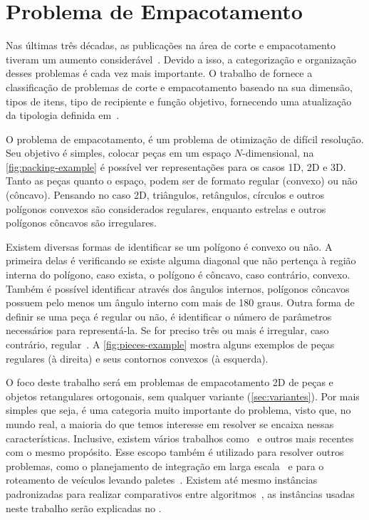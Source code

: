 \chapter{Problema de Empacotamento}\label{ch:problema-de-empacotamento}

Nas últimas três décadas, as publicações na área de corte e empacotamento tiveram um aumento
considerável~\cite{exact-solution-techniques,wascher2007improved}.
Devido a isso, a categorização e organização desses problemas é cada vez mais importante.
O trabalho de \citeauthor*{wascher2007improved} fornece a classificação de problemas de corte e
empacotamento baseado na sua dimensão, tipos de itens, tipo de recipiente e função objetivo,
fornecendo uma atualização da tipologia definida em~\cite{dyckhoff1990typology}.

O problema de empacotamento, é um problema de otimização de difícil resolução.
Seu objetivo é simples, colocar peças em um espaço $N$-dimensional, na \autoref{fig:packing-example}
é possível ver representações para os casos 1D, 2D e 3D\@.
Tanto as peças quanto o espaço, podem ser de formato regular (convexo) ou não (côncavo).
Pensando no caso 2D, triângulos, retângulos, círculos e outros polígonos convexos são
considerados regulares, enquanto estrelas e outros polígonos côncavos são irregulares.



Existem diversas formas de identificar se um polígono é convexo ou não.
A primeira delas é verificando se existe alguma diagonal que não pertença à região interna do
polígono, caso exista, o polígono é côncavo, caso contrário, convexo.
Também é possível identificar através dos ângulos internos, polígonos côncavos possuem pelo menos
um ângulo interno com mais de 180 graus.
Outra forma de definir se uma peça é regular ou não, é identificar o número de parâmetros
necessários para representá-la.
Se for preciso três ou mais é irregular, caso contrário, regular~\cite{aprendizado-reforco}.
A \autoref{fig:pieces-example} mostra alguns exemplos de peças regulares (à direita) e seus
contornos convexos (à esquerda).



O foco deste trabalho será em problemas de empacotamento 2D de peças e objetos retangulares
ortogonais, sem qualquer variante (\autoref{sec:variantes}).
Por mais simples que seja, é uma categoria muito importante do problema, visto que, no mundo real,
a maioria do que temos interesse em resolver se encaixa nessas características.
Inclusive, existem vários trabalhos como~\cite{wei2011skyline} e outros mais recentes~\cite{
    martin2020models,firat2020effective,chen2019efficient} com o mesmo propósito.
Esse escopo também é utilizado para resolver outros problemas, como o planejamento de integração em
larga escala~\cite{huang2007efficient} e para o roteamento de veículos levando paletes~\cite{
    silva2022integer}.
Existem até mesmo instâncias padronizadas para realizar comparativos entre algoritmos~\cite{
    2DPackLib}, as instâncias usadas neste trabalho serão explicadas no .

